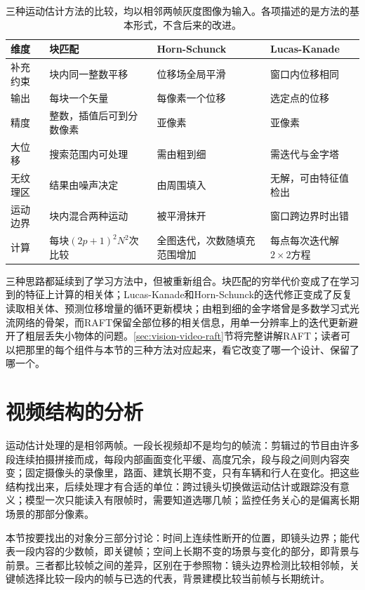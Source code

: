 \begin{table}[htbp]
  \centering
  \small
  \begin{tabularx}{\linewidth}{@{}lXXX@{}}
    \toprule
    维度 & 块匹配 & Horn-Schunck & Lucas-Kanade\\
    \midrule
    补充约束 & 块内同一整数平移 & 位移场全局平滑 & 窗口内位移相同\\
    输出 & 每块一个矢量 & 每像素一个位移 & 选定点的位移\\
    精度 & 整数，插值后可到分数像素 & 亚像素 & 亚像素\\
    大位移 & 搜索范围内可处理 & 需由粗到细 & 需迭代与金字塔\\
    无纹理区 & 结果由噪声决定 & 由周围填入 & 无解，可由特征值检出\\
    运动边界 & 块内混合两种运动 & 被平滑抹开 & 窗口跨边界时出错\\
    计算 & 每块$(2p+1)^2N^2$次比较 & 全图迭代，次数随填充范围增加 & 每点每次迭代解$2\times2$方程\\
    \bottomrule
  \end{tabularx}
  \caption{三种运动估计方法的比较，均以相邻两帧灰度图像为输入。各项描述的是方法的基本形式，不含后来的改进。}
  \label{tab:vision-videofound-motion-compare}
\end{table}

三种思路都延续到了学习方法中，但被重新组合。块匹配的穷举代价变成了在学习到的特征上计算的相关体；Lucas-Kanade和Horn-Schunck的迭代修正变成了反复读取相关体、预测位移增量的循环更新模块；由粗到细的金字塔曾是多数学习式光流网络的骨架，而RAFT保留全部位移的相关信息，用单一分辨率上的迭代更新避开了粗层丢失小物体的问题。\ref{sec:vision-video-raft}节将完整讲解RAFT；读者可以把那里的每个组件与本节的三种方法对应起来，看它改变了哪一个设计、保留了哪一个。

\section{视频结构的分析}
\label{sec:vision-videofound-structure}

运动估计处理的是相邻两帧。一段长视频却不是均匀的帧流：剪辑过的节目由许多段连续拍摄拼接而成，每段内部画面变化平缓、高度冗余，段与段之间则内容突变；固定摄像头的录像里，路面、建筑长期不变，只有车辆和行人在变化。把这些结构找出来，后续处理才有合适的单位：跨过镜头切换做运动估计或跟踪没有意义；模型一次只能读入有限帧时，需要知道选哪几帧；监控任务关心的是偏离长期场景的那部分像素。

本节按要找出的对象分三部分讨论：时间上连续性断开的位置，即镜头边界；能代表一段内容的少数帧，即关键帧；空间上长期不变的场景与变化的部分，即背景与前景。三者都比较帧之间的差异，区别在于参照物：镜头边界检测比较相邻帧，关键帧选择比较一段内的帧与已选的代表，背景建模比较当前帧与长期统计。

